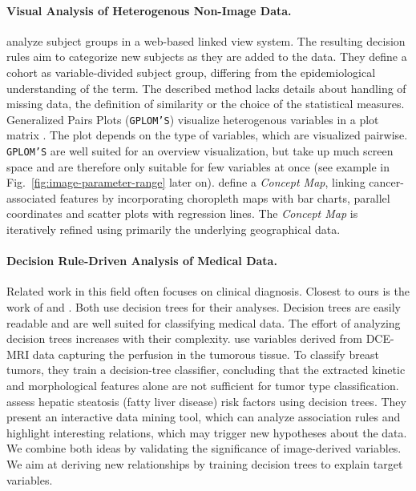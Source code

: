 \documentclass[a4paper,twoside]{style/article}
\begin{document}
\paragraph{Visual Analysis of Heterogenous Non-Image Data.}
\cite{Zhang} analyze subject groups in a web-based linked view system.
The resulting decision rules aim to categorize new subjects as they are added to the data.
They define a cohort as variable-divided subject group, differing from the epidemiological understanding of the term.
The described method lacks details about handling of missing data, the definition of similarity or the choice of the statistical measures.
Generalized Pairs Plots (\texttt{GPLOM'S}) visualize heterogenous variables in a plot matrix \cite{GPLOMS,Francois}.
The plot depends on the type of variables, which are visualized pairwise.
\texttt{GPLOM'S} are well suited for an overview visualization, but take up much screen space and are therefore only suitable for few variables at once (see example in Fig.~\ref{fig:image-parameter-range} later on).
\cite{Dai} define a \emph{Concept Map}, linking cancer-associated features by incorporating choropleth maps with bar charts, parallel coordinates and scatter plots with regression lines.
The \emph{Concept Map} is iteratively refined using primarily the underlying geographical data.
\paragraph{Decision Rule-Driven Analysis of Medical Data.}
Related work in this field often focuses on clinical diagnosis.
Closest to ours is the work of \cite{Glasser2013} and \cite{Niemann2014}.
Both use decision trees for their analyses.
Decision trees are easily readable and are well suited for classifying medical data.
The effort of analyzing decision trees increases with their complexity.
\cite{Glasser2013} use variables derived from DCE-MRI data capturing the perfusion in the tumorous tissue.
To classify breast tumors, they train a decision-tree classifier, concluding that the extracted kinetic and morphological features alone are not sufficient for tumor type classification.
\cite{Niemann2014} assess hepatic steatosis (fatty liver disease) risk factors using decision trees.
They present an interactive data mining tool, which can analyze association rules and highlight interesting relations, which may trigger new hypotheses about the data.
We combine both ideas by validating the significance of image-derived variables.
We aim at deriving new relationships by training decision trees to explain target variables.
\end{document}

